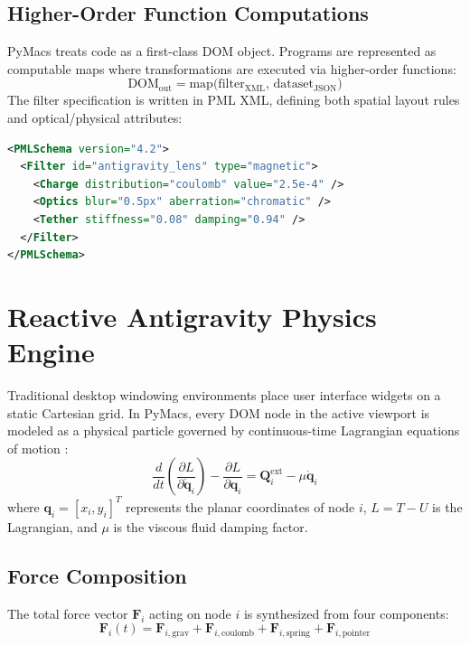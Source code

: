 \documentclass[10pt,twocolumn,letterpaper]{article}
\begin{document}
\subsection{Higher-Order Function Computations}
PyMacs treats code as a first-class DOM object. Programs are represented as computable maps where transformations are executed via higher-order functions:
\begin{equation}
    \mathrm{DOM}_{\mathrm{out}} = \mathrm{map}\Big(\mathrm{filter}_{\mathrm{XML}},\, \mathrm{dataset}_{\mathrm{JSON}}\Big)
\end{equation}
The filter specification is written in PML XML, defining both spatial layout rules and optical/physical attributes:
\begin{lstlisting}[language=XML,caption={Sample PML Filter Definition}]
<PMLSchema version="4.2">
  <Filter id="antigravity_lens" type="magnetic">
    <Charge distribution="coulomb" value="2.5e-4" />
    <Optics blur="0.5px" aberration="chromatic" />
    <Tether stiffness="0.08" damping="0.94" />
  </Filter>
</PMLSchema>
\end{lstlisting}

\section{Reactive Antigravity Physics Engine}
Traditional desktop windowing environments place user interface widgets on a static Cartesian grid. In PyMacs, every DOM node in the active viewport is modeled as a physical particle governed by continuous-time Lagrangian equations of motion \cite{goldstein2002classical}:
\begin{equation}
    \frac{d}{dt}\left(\frac{\partial L}{\partial \dot{\mathbf{q}}_i}\right) - \frac{\partial L}{\partial \mathbf{q}_i} = \mathbf{Q}_i^{\mathrm{ext}} - \mu \dot{\mathbf{q}}_i
\end{equation}
where $\mathbf{q}_i = [x_i, y_i]^T$ represents the planar coordinates of node $i$, $L = T - U$ is the Lagrangian, and $\mu$ is the viscous fluid damping factor.

\subsection{Force Composition}
The total force vector $\mathbf{F}_i$ acting on node $i$ is synthesized from four components:
\begin{equation}
    \mathbf{F}_i(t) = \mathbf{F}_{i,\mathrm{grav}} + \mathbf{F}_{i,\mathrm{coulomb}} + \mathbf{F}_{i,\mathrm{spring}} + \mathbf{F}_{i,\mathrm{pointer}}
\end{equation}
\end{document}

